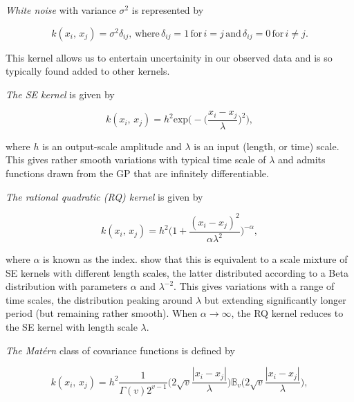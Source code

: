          \vspace{1em}

         \textit{White noise} with variance \(\sigma^2\) is represented by
         
         \[k(x_{i}, \, x_{j}) = \sigma^2\delta_{ij}, \, \text{where} \, \delta_{ij} = 1 \, \text{for} \, i = j \, \text{and} \, \delta_{ij} = 0 \, \text{for} \, i \neq j.\]

         This kernel allows us to entertain uncertainity in our observed data and is so typically found added to other kernels.

         \vspace{1em}

         \textit{The SE kernel} is given by

         \[k(x_{i}, \, x_{j}) = h^{2} \text{exp} \bigg(- \Big(\frac{x_i - x_j}{\lambda} \Big)^2 \bigg),\]

         where \(h\) is an output-scale amplitude and \(\lambda\) is an input (length, or time) scale. This gives rather smooth variations with typical time scale of \(\lambda\) and admits functions drawn from the GP that are infinitely differentiable.

         \vspace{1em}

         \textit{The rational quadratic (RQ) kernel} is given by

         \[k(x_{i}, \, x_{j}) = h^{2} \bigg(1 + \frac{(x_{i} - x_{j})^2}{\alpha\lambda^2} \bigg)^{-\alpha},\]

         where \(\alpha\) is known as the index. \cite{Rasmussen2006} show that this is equivalent to a scale mixture of SE kernels with different length scales, the latter distributed according to a Beta distribution with parameters \(\alpha\) and \(\lambda^{-2}\). This gives variations with a range of time scales, the distribution peaking around \(\lambda\) but extending significantly longer period (but remaining rather smooth). When \(\alpha \to \infty\), the RQ kernel reduces to the SE kernel with length scale \(\lambda\).

         \vspace{1em}

         \textit{The Mat\'ern} class of covariance functions is defined by

         \[k(x_{i}, \, x_{j}) = h^{2} \frac{1}{\Gamma(v)2^{v-1}} \bigg(2\sqrt{v}\frac{|x_{i} - x_{j}|}{\lambda} \bigg) \mathbb{B}_{v} \bigg(2\sqrt{v}\frac{|x_{i} - x_{j}|}{\lambda} \bigg),\]

